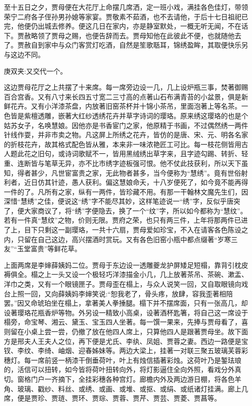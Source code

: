 \begin{parag}
    至十五日之夕，贾母便在大花厅上命摆几席洒，定一班小戏，满挂各色佳灯，带领荣宁二府各子侄孙男孙媳等家宴。贾敬素不茹酒，也不去请他，于后十七日祖祀已完，他便仍出城去修养。便这几日在家内，亦是静室默处，一概无听无闻，不在话下。贾赦略领了贾母之赐，也便告辞而去。贾母知他在此彼此不便，也就随他去了。贾赦自到家中与众门客赏灯吃酒，自然是笙歌聒耳，锦绣盈眸，其取便快乐另与这边不同。\begin{note}庚双夹:又交代一个。\end{note}
\end{parag}


\begin{parag}
    这边贾母花厅之上共摆了十来席。每一席旁边设一几，几上设炉瓶三事，焚著御赐百合宫香。又有八寸来长四五寸宽二三寸高的点著山石布满青苔的小盆景，俱是新鲜花卉。又有小洋漆茶盘，内放著旧窑茶杯并十锦小茶吊，里面泡著上等名茶。一色皆是紫檀透雕，嵌著大红纱透绣花卉并草字诗词的璎珞。原来绣这璎珞的也是个姑苏女子，名唤慧娘。因他亦是书香宦门之家，他原精于书画，不过偶然绣一两件针线作耍，并非市卖之物。凡这屏上所绣之花卉，皆仿的是唐、宋、元、明各名家的折枝花卉，故其格式配色皆从雅，本来非一味浓艳匠工可比。每一枝花侧皆用古人题此花之旧句，或诗词歌赋不一，皆用黑绒绣出草字来，且字迹勾踢、转折、轻重、连断皆与笔草无异，亦不比市绣字迹板强可恨。他不仗此技获利，所以天下虽知，得者甚少，凡世宦富贵之家，无此物者甚多，当今便称为“慧绣”。竟有世俗射利者，近日仿其针迹，愚人获利。偏这慧娘命夭，十八岁便死了，如今竟不能再得一件的了。凡所有之家，纵有一两件，皆珍藏不用。有那一干翰林文魔先生们，因深惜“慧绣”之佳，便说这“绣”字不能尽其妙，这样笔迹说一“绣”字，反似乎唐突了，便大家商议了，将“绣”字便隐去，换了一个“纹”字，所以如今都称为“慧纹”。若有一件真“慧纹”之物，价则无限。贾府之荣，也只有两三件，上年将那两件已进了上，目下只剩这一副璎珞，一共十六扇，贾母爱如珍宝，不入在请客各色陈设之内，只留在自己这边，高兴摆酒时赏玩。又有各色旧窑小瓶中都点缀著“岁寒三友”“玉堂富贵”等鲜花草。
\end{parag}


\begin{parag}
    上面两席是李婶薛姨妈二位。贾母于东边设一透雕夔龙护屏矮足短榻，靠背引枕皮褥俱全。榻之上一头又设一个极轻巧洋漆描金小几，几上放著茶吊、茶碗、漱盂、洋巾之类，又有一个眼镜匣子。贾母歪在榻上，与众人说笑一回，又自取眼镜向戏台上照一回，又向薛姨妈李婶笑说:“恕我老了，骨头疼，放肆，容我歪著相陪罢。”因又命琥珀坐在榻上，拿著美人拳捶腿。榻下并不摆席面，只有一张高几，却设著璎珞花瓶香炉等物。外另设一精致小高桌，设著酒杯匙箸，将自己这一席设于榻旁，命宝琴、湘云、黛玉、宝玉四人坐著。每一馔一果来，先捧与贾母看了，喜则留在小桌上尝一尝，仍撤了放在他四人席上，只算他四人是跟著贾母坐。故下面方是邢夫人王夫人之位，再下便是尤氏、李纨、凤姐、贾蓉之妻。西边一路便是宝钗、李纹、李绮、岫烟、迎春姊妹等。两边大梁上，挂著一对联三聚五玻璃芙蓉彩穗灯。每一席前竖一柄漆干倒垂荷叶，叶上有烛信插著彩烛。这荷叶乃是錾珐琅的，活信可以扭转，如今皆将荷叶扭转向外，将灯影逼住全向外照，看戏分外真切。窗格门户一齐摘下，全挂彩穗各种宫灯。廊檐内外及两边游日棚，将各色羊角、玻璃、戳纱、料丝、或绣、或画、或堆、或抠、或绢、或纸诸灯挂满。廊上几席，便是贾珍、贾琏、贾环、贾琮、贾蓉、贾芹、贾芸、贾菱、贾菖等。
\end{parag}


